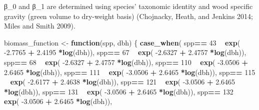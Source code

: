 \documentclass[
]{article}
\newenvironment{Shaded}{\begin{snugshade}}{\end{snugshade}}
\newcommand{\ControlFlowTok}[1]{\textcolor[rgb]{0.13,0.29,0.53}{\textbf{#1}}}
\newcommand{\DecValTok}[1]{\textcolor[rgb]{0.00,0.00,0.81}{#1}}
\newcommand{\FloatTok}[1]{\textcolor[rgb]{0.00,0.00,0.81}{#1}}
\newcommand{\KeywordTok}[1]{\textcolor[rgb]{0.13,0.29,0.53}{\textbf{#1}}}
\newcommand{\NormalTok}[1]{#1}
\newcommand{\OperatorTok}[1]{\textcolor[rgb]{0.81,0.36,0.00}{\textbf{#1}}}
\newcommand{\StringTok}[1]{\textcolor[rgb]{0.31,0.60,0.02}{#1}}
\begin{document}
β\_0 and β\_1 are determined using species' taxonomic identity and wood
specific gravity (green volume to dry-weight basis) (Chojnacky, Heath,
and Jenkins 2014; Miles and Smith 2009).

\begin{Shaded}
\begin{Highlighting}[]
\NormalTok{biomass_function <-}\StringTok{ }\ControlFlowTok{function}\NormalTok{(spp, dbh) \{ }
  \KeywordTok{case_when}\NormalTok{(}
\NormalTok{    spp}\OperatorTok{==}\StringTok{ }\DecValTok{43}  \OperatorTok{~}\StringTok{ }\KeywordTok{exp}\NormalTok{( }\FloatTok{-2.7765}   \OperatorTok{+}\StringTok{    }\FloatTok{2.4195} \OperatorTok{*}\KeywordTok{log}\NormalTok{(dbh)), }
\NormalTok{    spp}\OperatorTok{==}\StringTok{ }\DecValTok{67}  \OperatorTok{~}\StringTok{ }\KeywordTok{exp}\NormalTok{( }\FloatTok{-2.6327}   \OperatorTok{+}\StringTok{    }\FloatTok{2.4757} \OperatorTok{*}\KeywordTok{log}\NormalTok{(dbh)),}
\NormalTok{    spp}\OperatorTok{==}\StringTok{ }\DecValTok{68}  \OperatorTok{~}\StringTok{ }\KeywordTok{exp}\NormalTok{( }\FloatTok{-2.6327}   \OperatorTok{+}\StringTok{    }\FloatTok{2.4757} \OperatorTok{*}\KeywordTok{log}\NormalTok{(dbh)),}
\NormalTok{    spp}\OperatorTok{==}\StringTok{ }\DecValTok{110} \OperatorTok{~}\StringTok{ }\KeywordTok{exp}\NormalTok{( }\FloatTok{-3.0506}   \OperatorTok{+}\StringTok{    }\FloatTok{2.6465} \OperatorTok{*}\KeywordTok{log}\NormalTok{(dbh)),}
\NormalTok{    spp}\OperatorTok{==}\StringTok{ }\DecValTok{111} \OperatorTok{~}\StringTok{ }\KeywordTok{exp}\NormalTok{( }\FloatTok{-3.0506}   \OperatorTok{+}\StringTok{    }\FloatTok{2.6465} \OperatorTok{*}\KeywordTok{log}\NormalTok{(dbh)),}
\NormalTok{    spp}\OperatorTok{==}\StringTok{ }\DecValTok{115} \OperatorTok{~}\StringTok{ }\KeywordTok{exp}\NormalTok{( }\FloatTok{-2.6177}   \OperatorTok{+}\StringTok{    }\FloatTok{2.4638} \OperatorTok{*}\KeywordTok{log}\NormalTok{(dbh)),}
\NormalTok{    spp}\OperatorTok{==}\StringTok{ }\DecValTok{121} \OperatorTok{~}\StringTok{ }\KeywordTok{exp}\NormalTok{( }\FloatTok{-3.0506}   \OperatorTok{+}\StringTok{    }\FloatTok{2.6465} \OperatorTok{*}\KeywordTok{log}\NormalTok{(dbh)),}
\NormalTok{    spp}\OperatorTok{==}\StringTok{ }\DecValTok{131} \OperatorTok{~}\StringTok{ }\KeywordTok{exp}\NormalTok{( }\FloatTok{-3.0506}   \OperatorTok{+}\StringTok{    }\FloatTok{2.6465} \OperatorTok{*}\KeywordTok{log}\NormalTok{(dbh)),}
\NormalTok{    spp}\OperatorTok{==}\StringTok{ }\DecValTok{132} \OperatorTok{~}\StringTok{ }\KeywordTok{exp}\NormalTok{( }\FloatTok{-3.0506}   \OperatorTok{+}\StringTok{    }\FloatTok{2.6465} \OperatorTok{*}\KeywordTok{log}\NormalTok{(dbh)),}

\end{Highlighting}
\end{Shaded}
\end{document}
